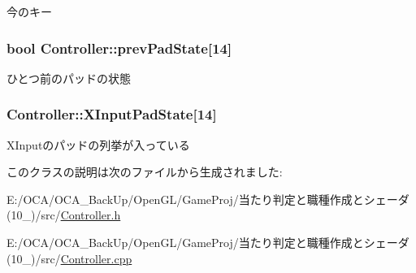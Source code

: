 今のキー 

\hypertarget{class_controller_a95bfdb374295856d3152e7a6ec338b89}{
\subsubsection[{prev\-Pad\-State}]{\setlength{\rightskip}{0pt plus 5cm}bool Controller\-::prev\-Pad\-State\mbox{[}14\mbox{]}\hspace{0.3cm}{\ttfamily [protected]}}}\label{class_controller_a95bfdb374295856d3152e7a6ec338b89}
ひとつ前のパッドの状態 \hypertarget{class_controller_a80605df285276d88908693110844ea77}{
\subsubsection[{X\-Input\-Pad\-State}]{ Controller\-::\-X\-Input\-Pad\-State\mbox{[}14\mbox{]}\hspace{0.3cm}{\ttfamily [protected]}}}\label{class_controller_a80605df285276d88908693110844ea77}


X\-Inputのパッドの列挙が入っている 



このクラスの説明は次のファイルから生成されました\-:\begin{DoxyCompactItemize}
\item 
E\-:/\-O\-C\-A/\-O\-C\-A\-\_\-\-Back\-Up/\-Open\-G\-L/\-Game\-Proj/当たり判定と職種作成とシェーダ(10\-\_)/src/\hyperlink{_controller_8h}{Controller.\-h}\item 
E\-:/\-O\-C\-A/\-O\-C\-A\-\_\-\-Back\-Up/\-Open\-G\-L/\-Game\-Proj/当たり判定と職種作成とシェーダ(10\-\_)/src/\hyperlink{_controller_8cpp}{Controller.\-cpp}\end{DoxyCompactItemize}
